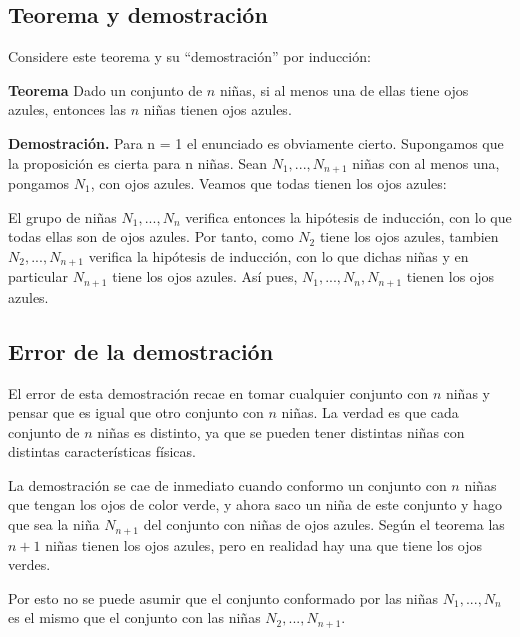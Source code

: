 \documentclass[../doc.tex]{subfiles}
\begin{document}
\subsection{Teorema y demostración}
Considere este teorema y su “demostración” por inducción:

\noindent \textbf{Teorema} Dado un conjunto de \(n\) niñas, si al menos una de ellas tiene ojos azules, entonces las \(n\) niñas tienen ojos azules.

\noindent \textbf{Demostración.} Para n = 1 el enunciado es obviamente cierto. Supongamos que la proposición es cierta para n niñas.
Sean \(N_1, ... , N_{n+1}\) niñas con al menos una, pongamos \(N_1\), con ojos azules. Veamos que todas tienen los ojos azules:

\noindent El grupo de niñas \(N_1, ... , N_n\) verifica entonces la hipótesis de inducción, con lo que todas ellas son de ojos azules. Por tanto, como \(N_2\) tiene los ojos azules, tambien \(N_2, ... , N_{n+1}\) verifica la hipótesis de inducción, con lo que dichas niñas y en particular \(N_{n+1}\) tiene los ojos azules. Así pues, \(N_1, ... , N_n, N_{n+1}\) tienen los ojos azules.

\subsection{Error de la demostración}
El error de esta demostración recae en tomar cualquier conjunto con \(n\) niñas y pensar que es igual que otro conjunto con \(n\) niñas. La verdad es que cada conjunto de \(n\) niñas es distinto, ya que se pueden tener distintas niñas con distintas características físicas.

\noindent La demostración se cae de inmediato cuando conformo un conjunto con \(n\) niñas que tengan los ojos de color verde, y ahora saco un niña de este conjunto y hago que sea la niña \(N_{n+1}\) del conjunto con niñas de ojos azules. Según el teorema las \(n + 1\) niñas tienen los ojos azules, pero en realidad hay una que tiene los ojos verdes.

\noindent Por esto no se puede asumir que el conjunto conformado por las niñas \(N_1, ... , N_n\) es el mismo que el conjunto con las niñas \(N_2, ... , N_{n+1}\).
\end{document}
